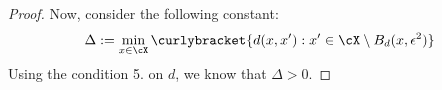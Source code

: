 \begin{proof}
    
    Now, consider the following constant:
    \begin{align*}
        \Delta := \min_{x \in \cX} \curlybracket{d(x,x') : x' \in \cX \setminus B_d(x,\epsilon^2)}
    \end{align*}
    Using the condition 5. on $d$, we know that $\Delta > 0$. %


\end{proof}
